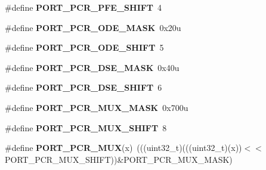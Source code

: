 \begin{DoxyCompactItemize}
\item 
\#define {\bfseries P\+O\+R\+T\+\_\+\+P\+C\+R\+\_\+\+P\+F\+E\+\_\+\+S\+H\+I\+FT}~4\hypertarget{group__PORT__Register__Masks_gae7d057ebd3218784fca57f55a85f2d29}{}\label{group__PORT__Register__Masks_gae7d057ebd3218784fca57f55a85f2d29}

\item 
\#define {\bfseries P\+O\+R\+T\+\_\+\+P\+C\+R\+\_\+\+O\+D\+E\+\_\+\+M\+A\+SK}~0x20u\hypertarget{group__PORT__Register__Masks_gacbe19f0087a51a8c26c51838b7a555d2}{}\label{group__PORT__Register__Masks_gacbe19f0087a51a8c26c51838b7a555d2}

\item 
\#define {\bfseries P\+O\+R\+T\+\_\+\+P\+C\+R\+\_\+\+O\+D\+E\+\_\+\+S\+H\+I\+FT}~5\hypertarget{group__PORT__Register__Masks_gac4871a3c3a20a51a3a57131d34e427e0}{}\label{group__PORT__Register__Masks_gac4871a3c3a20a51a3a57131d34e427e0}

\item 
\#define {\bfseries P\+O\+R\+T\+\_\+\+P\+C\+R\+\_\+\+D\+S\+E\+\_\+\+M\+A\+SK}~0x40u\hypertarget{group__PORT__Register__Masks_gae1c37b9f66e58bd80e7764232fd05cee}{}\label{group__PORT__Register__Masks_gae1c37b9f66e58bd80e7764232fd05cee}

\item 
\#define {\bfseries P\+O\+R\+T\+\_\+\+P\+C\+R\+\_\+\+D\+S\+E\+\_\+\+S\+H\+I\+FT}~6\hypertarget{group__PORT__Register__Masks_ga00ae08038ade5432d0240666658d8867}{}\label{group__PORT__Register__Masks_ga00ae08038ade5432d0240666658d8867}

\item 
\#define {\bfseries P\+O\+R\+T\+\_\+\+P\+C\+R\+\_\+\+M\+U\+X\+\_\+\+M\+A\+SK}~0x700u\hypertarget{group__PORT__Register__Masks_ga0feec5fc6b285b83c573f913c74e5c41}{}\label{group__PORT__Register__Masks_ga0feec5fc6b285b83c573f913c74e5c41}

\item 
\#define {\bfseries P\+O\+R\+T\+\_\+\+P\+C\+R\+\_\+\+M\+U\+X\+\_\+\+S\+H\+I\+FT}~8\hypertarget{group__PORT__Register__Masks_gaa39e1cfed4df3797e4f1d141adab8776}{}\label{group__PORT__Register__Masks_gaa39e1cfed4df3797e4f1d141adab8776}

\item 
\#define {\bfseries P\+O\+R\+T\+\_\+\+P\+C\+R\+\_\+\+M\+UX}(x)~(((uint32\+\_\+t)(((uint32\+\_\+t)(x))$<$$<$P\+O\+R\+T\+\_\+\+P\+C\+R\+\_\+\+M\+U\+X\+\_\+\+S\+H\+I\+FT))\&P\+O\+R\+T\+\_\+\+P\+C\+R\+\_\+\+M\+U\+X\+\_\+\+M\+A\+SK)\hypertarget{group__PORT__Register__Masks_ga13b6c873e0e5385583b1f7907a9f796a}{}\label{group__PORT__Register__Masks_ga13b6c873e0e5385583b1f7907a9f796a}


\end{DoxyCompactItemize}
